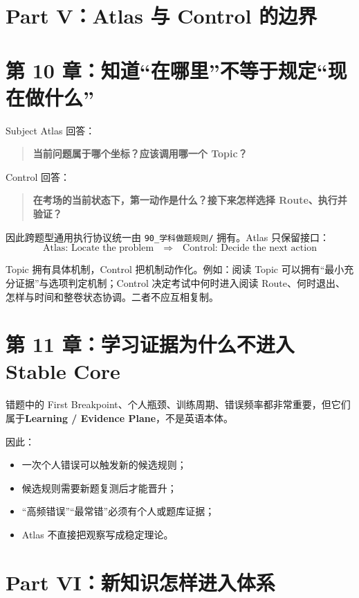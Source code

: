 \documentclass[11pt,a4paper]{ctexart}
\newcommand{\kw}[1]{\textbf{#1}}
\begin{document}
\newpage
\section{Part V：Atlas 与 Control 的边界}

\section{第 10 章：知道“在哪里”不等于规定“现在做什么”}

Subject Atlas 回答：
\begin{quote}
\kw{当前问题属于哪个坐标？应该调用哪一个 Topic？}
\end{quote}

Control 回答：
\begin{quote}
\kw{在考场的当前状态下，第一动作是什么？接下来怎样选择 Route、执行并验证？}
\end{quote}

因此跨题型通用执行协议统一由 \texttt{90\_学科做题规则/} 拥有。Atlas 只保留接口：
\[
\boxed{
\text{Atlas: Locate the problem}
\quad\Longrightarrow\quad
\text{Control: Decide the next action}
}
\]

\begin{bridge}
Topic 拥有具体机制，Control 把机制动作化。例如：阅读 Topic 可以拥有“最小充分证据”与选项判定机制；Control 决定考试中何时进入阅读 Route、何时退出、怎样与时间和整卷状态协调。二者不应互相复制。
\end{bridge}

\section{第 11 章：学习证据为什么不进入 Stable Core}

错题中的 First Breakpoint、个人瓶颈、训练周期、错误频率都非常重要，但它们属于\kw{Learning / Evidence Plane}，不是英语本体。

因此：
\begin{itemize}
  \item 一次个人错误可以触发新的候选规则；
  \item 候选规则需要新题复测后才能晋升；
  \item “高频错误”“最常错”必须有个人或题库证据；
  \item Atlas 不直接把观察写成稳定理论。
\end{itemize}

\newpage
\section{Part VI：新知识怎样进入体系}
\end{document}
